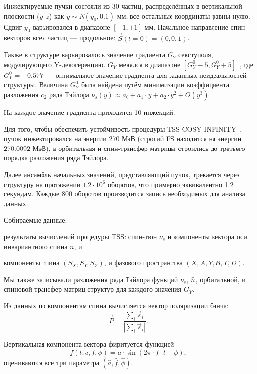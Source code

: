 Инжектируемые пучки состояли из 30 частиц, распределённых в вертикальной
плоскости ($y$--$z$) как $y\sim N(y_0, 0.1)$ мм; все остальные координаты равны нулю.
Сдвиг $y_0$ варьировался в диапазоне $[-1, +1]$ мм. Начальное
направление спин-векторов всех частиц --- продольное: $\vec S(t=0) = (0,0,1)$.

Также в структуре варьировалось значение градиента $G_Y$ секступоля,
модулирующего Y-декогеренцию. $G_Y$ менялся в
диапазоне ${[G_Y^0 - 5, G_Y^0 + 5]}$~\Tlmsq, где
$G_Y^0=-0.577$~\Tlmsq --- оптимальное значение градиента для заданных 
неидеальностей структуры. Величина $G_Y^0$ была найдена путём минимизации коэффициента разложения $a_2$
ряда Тэйлора $\nu_s(y) \approx a_0 + a_1\cdot y + a_2\cdot y^2 + O(y^3)$.

На каждое значение градиента приходится 10 инжекций.

Для того, чтобы обеспечить устойчивость процедуры TSS COSY INFINITY~\cite{COSYINF:Manual:BeamPhys}, пучок инжектировался на энергии 270 МэВ (строгий FS находится на энергии 270.0092 МэВ), а 
орбитальная и спин-трансфер матрицы  строились до третьего порядка разложения ряда Тэйлора. 

Далее ансамбль начальных значений, представляющий пучок, трекается
через структуру на протяжении $1.2\cdot10^6$ оборотов, что
примерно эквивалентно 1.2 секундам. Каждые 800 оборотов производится
запись необходимых для анализа данных.

Собираемые данные: 
\begin{enumerate*}
	\item результаты вычислений процедуры TSS: спин-тюн $\nu_s$ и компоненты вектора оси инвариантного спина $\bar n$, и
	\item компоненты спина $(S_X, S_Y, S_Z)$, и фазового пространства $(X,A,Y,B,T,D)$.
\end{enumerate*}
Мы также записывали разложения ряда Тэйлора функций $\nu_s$, $\bar n$, орбитальной, и спиновой трансфер матриц
структур для каждого значения $G_Y$.

Из данных по компонентам спина вычисляется вектор поляризации банча:
\begin{equation}\label{eq:polarization_formula}
\vec P = \frac{\sum_i\vec s_i}{|\sum_i\vec s_i|}.
\end{equation}

Вертикальная компонента вектора фиритуется функцией 
\[
{f(t; a,f,\phi) = a\cdot \sin(2\pi\cdot f\cdot t + \phi)},
\]
оцениваются все три параметра 
${(\hat a, \hat f, \hat\phi)}$. 

